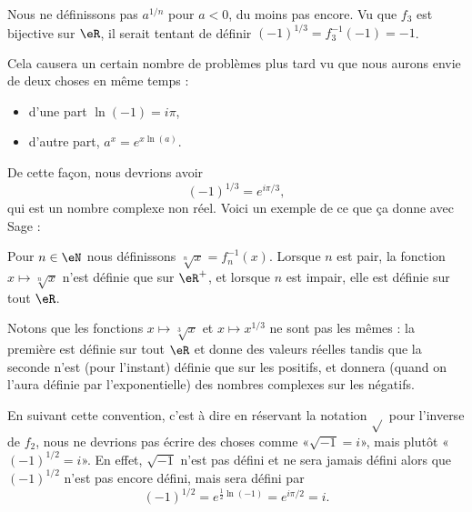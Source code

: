 \begin{normaltext}      \label{NORMooDUNZooUNdUKg}
    Nous ne définissons pas \( a^{1/n}\) pour \( a<0\), du moins pas encore. Vu que \( f_3\) est bijective sur \( \eR\), il serait tentant de définir \( (-1)^{1/3}=f_3^{-1}(-1)=-1\).

    Cela causera un certain nombre de problèmes plus tard vu que nous aurons envie de deux choses en même temps :
    \begin{itemize}
        \item d'une part \( \ln(-1)=i\pi\),
        \item d'autre part, \( a^x= e^{x\ln(a)}\).
    \end{itemize}
    De cette façon, nous devrions avoir
    \begin{equation}
        (-1)^{1/3}= e^{i\pi /3},
    \end{equation}
    qui est un nombre complexe non réel. Voici un exemple de ce que ça donne avec Sage :
    
\end{normaltext}

\begin{definition}[Racince]
    Pour \( n\in \eN\) nous définissons \( \sqrt[n]{ x }=f_n^{-1}(x)\). Lorsque \( n\) est pair, la fonction \( x\mapsto\sqrt[n]{ x }\) n'est définie que sur \( \eR^+\), et lorsque \( n\) est impair, elle est définie sur tout \( \eR\).
\end{definition}

\begin{normaltext}      \label{NORMooYPRNooWCjEgR}
    Notons que les fonctions \( x\mapsto \sqrt[3]{ x }\) et \( x\mapsto x^{1/3}\) ne sont pas les mêmes : la première est définie sur tout \( \eR\) et donne des valeurs réelles tandis que la seconde n'est (pour l'instant) définie que sur les positifs, et donnera (quand on l'aura définie par l'exponentielle) des nombres complexes sur les négatifs.

    En suivant cette convention, c'est à dire en réservant la notation \( \sqrt{  }\) pour l'inverse de \( f_2\), nous ne devrions pas écrire des choses comme «\( \sqrt{ -1 }=i\)», mais plutôt «\( (-1)^{1/2}=i \)». En effet, \( \sqrt{ -1 }\) n'est pas défini et ne sera jamais défini alors que \( (-1)^{1/2}\) n'est pas encore défini, mais sera défini par 
    \begin{equation}
        (-1)^{1/2}= e^{\frac{ 1 }{2}\ln(-1)}= e^{i\pi/2}=i.
    \end{equation}
\end{normaltext}

